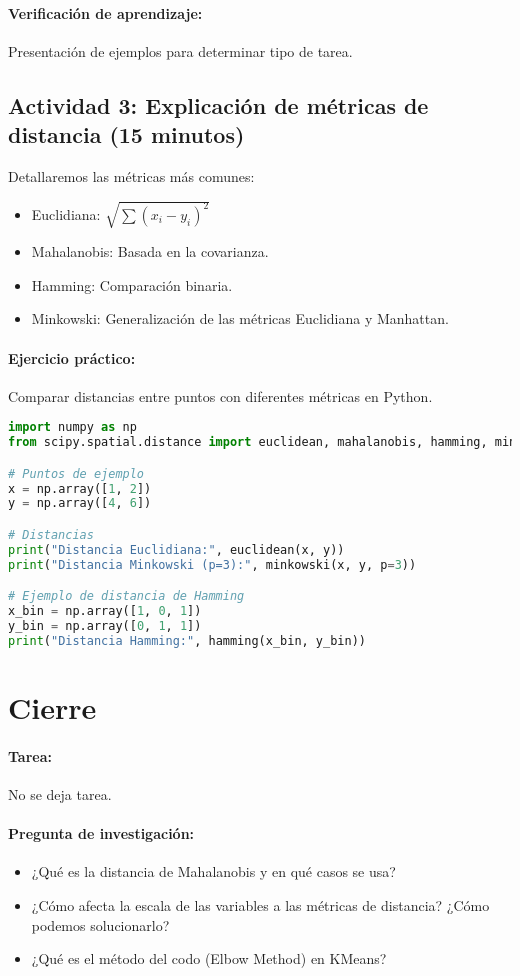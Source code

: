 \documentclass[a4,11pt]{aleph-notas}
\begin{document}
\paragraph{Verificación de aprendizaje:} Presentación de ejemplos para determinar tipo de tarea.

\subsection*{Actividad 3: Explicación de métricas de distancia (15 minutos)}  
Detallaremos las métricas más comunes:
\begin{itemize}
    \item Euclidiana: $\sqrt{\sum (x_i - y_i)^2}$
    \item Mahalanobis: Basada en la covarianza.
    \item Hamming: Comparación binaria.
    \item Minkowski: Generalización de las métricas Euclidiana y Manhattan.
\end{itemize}

\paragraph{Ejercicio práctico:} Comparar distancias entre puntos con diferentes métricas en Python.

\begin{pycodigo}
\begin{lstlisting}[language=Python]
import numpy as np
from scipy.spatial.distance import euclidean, mahalanobis, hamming, minkowski

# Puntos de ejemplo
x = np.array([1, 2])
y = np.array([4, 6])

# Distancias
print("Distancia Euclidiana:", euclidean(x, y))
print("Distancia Minkowski (p=3):", minkowski(x, y, p=3))

# Ejemplo de distancia de Hamming
x_bin = np.array([1, 0, 1])
y_bin = np.array([0, 1, 1])
print("Distancia Hamming:", hamming(x_bin, y_bin))
\end{lstlisting}
\end{pycodigo}

\section*{Cierre}

\paragraph{Tarea:}  
    No se deja tarea.

\paragraph{Pregunta de investigación:}  
    \begin{itemize}
        \item ¿Qué es la distancia de Mahalanobis y en qué casos se usa?
        \item ¿Cómo afecta la escala de las variables a las métricas de distancia? ¿Cómo podemos solucionarlo?
        \item ¿Qué es el método del codo (Elbow Method) en KMeans?
    \end{itemize}
\end{document}
